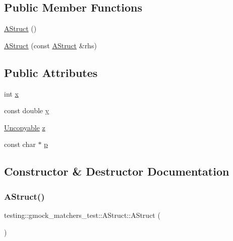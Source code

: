 \subsection*{Public Member Functions}
\begin{DoxyCompactItemize}
\item 
\hyperlink{structtesting_1_1gmock__matchers__test_1_1_a_struct_a6774561607c8ca64809e9ebde4b62b0e}{A\+Struct} ()
\item 
\hyperlink{structtesting_1_1gmock__matchers__test_1_1_a_struct_ac5b9c0054e929e8883e13123aef50ff3}{A\+Struct} (const \hyperlink{structtesting_1_1gmock__matchers__test_1_1_a_struct}{A\+Struct} \&rhs)
\end{DoxyCompactItemize}
\subsection*{Public Attributes}
\begin{DoxyCompactItemize}
\item 
int \hyperlink{structtesting_1_1gmock__matchers__test_1_1_a_struct_a539eea02599ad34ff2bf90cc2c1adf26}{x}
\item 
const double \hyperlink{structtesting_1_1gmock__matchers__test_1_1_a_struct_a08b8592764aa4775c3d5a3542470f8bb}{y}
\item 
\hyperlink{classtesting_1_1gmock__matchers__test_1_1_uncopyable}{Uncopyable} \hyperlink{structtesting_1_1gmock__matchers__test_1_1_a_struct_a45b1006e4a7b21037610a385dcae6d8c}{z}
\item 
const char $\ast$ \hyperlink{structtesting_1_1gmock__matchers__test_1_1_a_struct_a65755db7d763d53c13483bb520f1efcd}{p}
\end{DoxyCompactItemize}


\subsection{Constructor \& Destructor Documentation}
\mbox{\label{structtesting_1_1gmock__matchers__test_1_1_a_struct_a6774561607c8ca64809e9ebde4b62b0e}} 
\subsubsection{\texorpdfstring{A\+Struct()}{AStruct()}\hspace{0.1cm}{\footnotesize\ttfamily [1/2]}}
{\footnotesize\ttfamily testing\+::gmock\+\_\+matchers\+\_\+test\+::\+A\+Struct\+::\+A\+Struct (\begin{DoxyParamCaption}{ }\end{DoxyParamCaption})\hspace{0.3cm}{\ttfamily [inline]}}


